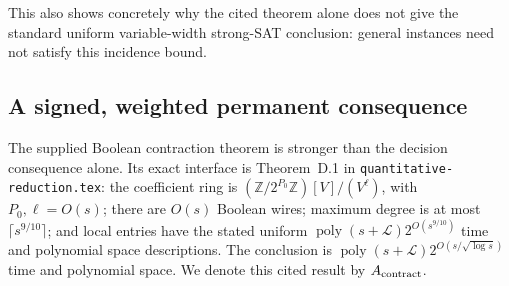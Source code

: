 \documentclass[11pt,a4paper]{article}
\begin{document}
This also shows concretely why the cited theorem alone does not give the
standard uniform variable-width strong-SAT conclusion: general instances
need not satisfy this incidence bound.

\subsection{A signed, weighted permanent consequence}

The supplied Boolean contraction theorem is stronger than the decision
consequence alone.  Its exact interface is Theorem~D.1 in
\texttt{quantitative-reduction.tex}: the coefficient ring is
\((\mathbb Z/2^{P_0}\mathbb Z)[V]/(V^\ell)\), with \(P_0,\ell=O(s)\);
there are \(O(s)\) Boolean wires; maximum degree is at most
\(\lceil s^{9/10}\rceil\); and local entries have the stated uniform
\(\operatorname{poly}(s+\mathcal L)2^{O(s^{9/10})}\) time and polynomial
space descriptions.  The conclusion is
\(\operatorname{poly}(s+\mathcal L)2^{O(s/\sqrt{\log s})}\) time and
polynomial space.  We denote this cited result by \(A_{\rm contract}\).
\end{document}
